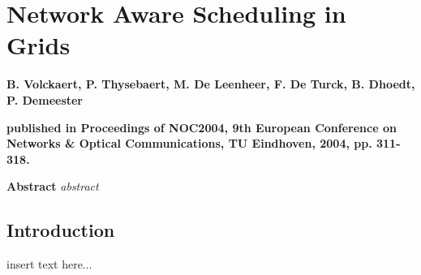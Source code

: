 \graphicspath{{chapt_dutch/}{intro/}{chapt2/}{chapt3/}{chapt4/}{chapt5/}}

\renewcommand\evenpagerightmark{{\scshape\small Appendix C}}
\renewcommand\oddpageleftmark{{\scshape\small Network Aware Scheduling in Grids}}

\renewcommand{\bibname}{References}

\hyphenation{}

\chapter[Network Aware Scheduling in Grids]%
 {Network Aware Scheduling in Grids}
\label{app3}

\par{\large{\textbf{B. Volckaert, P. Thysebaert, M. De Leenheer, F. De Turck, B. Dhoedt, P. Demeester}}}
\vspace{0.2in}
\par{\noindent\textbf{published in Proceedings of NOC2004, 9th European Conference on Networks \& Optical Communications, TU Eindhoven, 2004, pp. 311-318.}}
\vspace{0.1in}

\par{\bf{Abstract}}
\emph{
  abstract
}

\section{Introduction}
insert text here...

\lipsum




\clearpage{\pagestyle{empty}\cleardoublepage}
